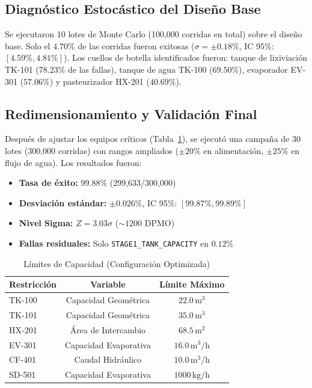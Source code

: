 \documentclass[10pt,letterpaper]{article}
\begin{document}
\subsection{Diagn\'ostico Estoc\'astico del Dise\~no Base}

Se ejecutaron 10 lotes de Monte Carlo (100,000 corridas en total) sobre el dise\~no base. Solo el $4.70\%$ de las corridas fueron exitosas ($\sigma = \pm 0.18\%$, IC 95\%: $[4.59\%, 4.81\%]$). Los cuellos de botella identificados fueron: tanque de lixiviaci\'on TK-101 ($78.23\%$ de las fallas), tanque de agua TK-100 ($69.50\%$), evaporador EV-301 ($57.06\%$) y pasteurizador HX-201 ($40.69\%$).

\subsection{Redimensionamiento y Validaci\'on Final}

Despu\'es de ajustar los equipos cr\'iticos (Tabla~\ref{tab:restrictions}), se ejecut\'o una campa\~na de 30 lotes (300,000 corridas) con rangos ampliados ($\pm20\%$ en alimentaci\'on, $\pm25\%$ en flujo de agua). Los resultados fueron:

\begin{itemize}
    \item \textbf{Tasa de \'exito:} $99.88\%$ (299,633/300,000)
    \item \textbf{Desviaci\'on est\'andar:} $\pm 0.026\%$, IC 95\%: $[99.87\%, 99.89\%]$
    \item \textbf{Nivel Sigma:} $Z = 3.03\sigma$ ($\sim1200$ DPMO)
    \item \textbf{Fallas residuales:} Solo \texttt{STAGE1\_TANK\_CAPACITY} en $0.12\%$
\end{itemize}

\begin{table}[!ht]
\centering
\caption{L\'imites de Capacidad (Configuraci\'on Optimizada)}
\label{tab:restrictions}
\small
\begin{tabular}{lcc}
\toprule
Restricci\'on & Variable & L\'imite M\'aximo \\
\midrule
TK-100 & Capacidad Geom\'etrica & $22.0\,\text{m}^3$ \\
TK-101 & Capacidad Geom\'etrica & $35.0\,\text{m}^3$ \\
HX-201 & \'Area de Intercambio & $68.5\,\text{m}^2$ \\
EV-301 & Capacidad Evaporativa & $16.0\,\text{m}^3/\text{h}$ \\
CF-401 & Caudal Hidr\'aulico & $10.0\,\text{m}^3/\text{h}$ \\
SD-501 & Capacidad Evaporativa & $1000\,\text{kg/h}$ \\
\bottomrule
\end{tabular}
\end{table}
\end{document}
